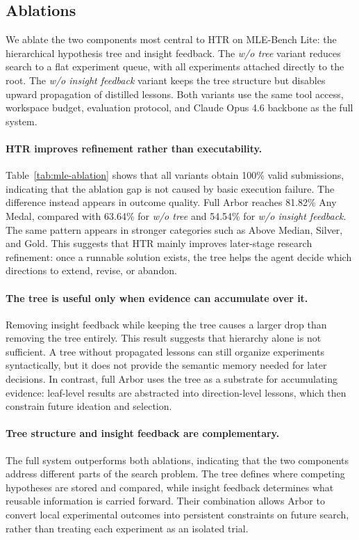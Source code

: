 \documentclass[]{selfevolagent}
\theoremstyle{plain}
\theoremstyle{definition}
\theoremstyle{remark}
\begin{document}
\subsection{Ablations}
\label{sec:exp-ablation}

We ablate the two components most central to HTR on MLE-Bench Lite: the hierarchical hypothesis tree and insight feedback. The \textit{w/o tree} variant reduces search to a flat experiment queue, with all experiments attached directly to the root. The \textit{w/o insight feedback} variant keeps the tree structure but disables upward propagation of distilled lessons. Both variants use the same tool access, workspace budget, evaluation protocol, and Claude Opus 4.6 backbone as the full system.

\paragraph{HTR improves refinement rather than executability.}
Table~\ref{tab:mle-ablation} shows that all variants obtain 100\% valid submissions, indicating that the ablation gap is not caused by basic execution failure. The difference instead appears in outcome quality. Full Arbor reaches 81.82\% Any Medal, compared with 63.64\% for \textit{w/o tree} and 54.54\% for \textit{w/o insight feedback}. The same pattern appears in stronger categories such as Above Median, Silver, and Gold. This suggests that HTR mainly improves later-stage research refinement: once a runnable solution exists, the tree helps the agent decide which directions to extend, revise, or abandon.

\paragraph{The tree is useful only when evidence can accumulate over it.}
Removing insight feedback while keeping the tree causes a larger drop than removing the tree entirely. This result suggests that hierarchy alone is not sufficient. A tree without propagated lessons can still organize experiments syntactically, but it does not provide the semantic memory needed for later decisions. In contrast, full Arbor uses the tree as a substrate for accumulating evidence: leaf-level results are abstracted into direction-level lessons, which then constrain future ideation and selection.

\paragraph{Tree structure and insight feedback are complementary.}
The full system outperforms both ablations, indicating that the two components address different parts of the search problem. The tree defines where competing hypotheses are stored and compared, while insight feedback determines what reusable information is carried forward. Their combination allows Arbor to convert local experimental outcomes into persistent constraints on future search, rather than treating each experiment as an isolated trial.
\end{document}
